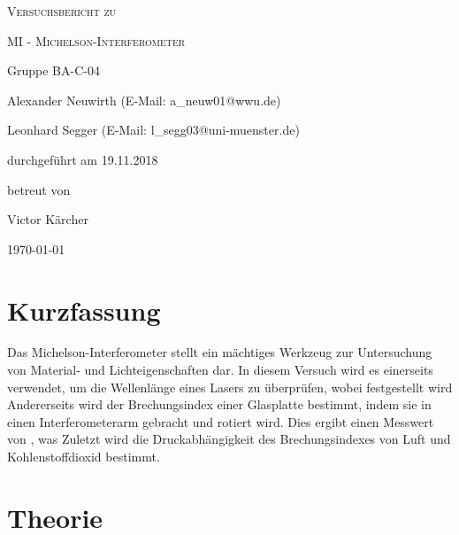\documentclass[
	a4paper,
	12pt,
	pagesize,
	ngerman
]{scrartcl}
\begin{document}
	\begin{titlepage}
		\centering
		{\scshape\LARGE Versuchsbericht zu \par}
		\vspace{1cm}
		{\scshape\huge MI - Michelson-Interferometer \par} %
		\vspace{2.5cm}
		{\LARGE Gruppe BA-C-04 \par}
		\vspace{0.5cm}

		{\large Alexander Neuwirth (E-Mail: a\_neuw01@wwu.de) \par}
		{\large Leonhard Segger (E-Mail: l\_segg03@uni-muenster.de) \par}
		\vfill

		durchgeführt am 19.11.2018\par
		betreut von\par
		{\large Victor Kärcher} %

		\vfill

		{\large \today\par}
	\end{titlepage}
	\tableofcontents
	\newpage


	\section{Kurzfassung}
	Das Michelson-Interferometer stellt ein mächtiges Werkzeug zur Untersuchung von Material- und Lichteigenschaften dar.
	In diesem Versuch wird es einerseits verwendet, um die Wellenlänge eines Lasers zu überprüfen, wobei festgestellt wird %
	Andererseits wird der Brechungsindex einer Glasplatte bestimmt, indem sie in einen Interferometerarm gebracht und rotiert wird.
	Dies ergibt einen Messwert von , was %
	Zuletzt wird die Druckabhängigkeit des Brechungsindexes von Luft und Kohlenstoffdioxid bestimmt.


	\section{Theorie}
\end{document}
